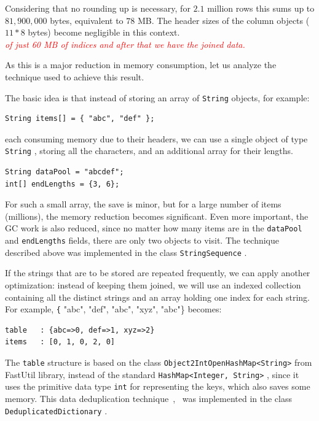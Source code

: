\documentclass[a4paper,twoside]{article}
\begin{document}
Considering that no rounding up is necessary, for $2.1$ million rows this sums up to $81,900,000$ bytes,
equivalent to $78$ MB. The header sizes of the column objects ($11*8$ bytes) become negligible in this context.
\\ \textcolor{red}{{\textit{of just 60 MB of indices and after that we have the joined data.} }}

As this is a major reduction in memory consumption, let us analyze the technique used to achieve this result.

The basic idea is that instead of storing an array of {\texttt{String} } objects, for example:
\begin{verbatim}
String items[] = { "abc", "def" };
\end{verbatim}
each consuming memory due to their headers, we can use 
a single object of type {\texttt{String} }, storing all the characters, and an additional array for their lengths.
\begin{verbatim}
String dataPool = "abcdef";
int[] endLengths = {3, 6};
\end{verbatim}

For such a small array, the save is minor, but for a large number of items (millions), the memory reduction becomes significant.
Even more important, the GC work is also reduced, since no matter how many items are in the {\texttt{dataPool} } and {\texttt{endLengths} } fields, there are only two objects to visit.
The technique described above was implemented in the class {\texttt{StringSequence} }.

If the strings that are to be stored are repeated frequently, we can apply another optimization:
instead of keeping them joined, we will use an indexed collection containing all the distinct strings and an array holding one index for each string.
For example, {\texttt{\{} "abc", "def", "abc", "xyz", "abc"\} } becomes:
\begin{verbatim}
table   : {abc=>0, def=>1, xyz=>2}
items   : [0, 1, 0, 2, 0]
\end{verbatim}
The {\texttt{table} } structure is based on the class {\texttt{Object2IntOpenHashMap<String>} } from FastUtil library, instead of the standard {\texttt{HashMap<Integer, String>} }, since it uses the primitive data type {\texttt{int} } for representing the keys, which also saves some memory.
This data deduplication technique~\cite{he:2010},~\cite{manogar:2014} was implemented in the class {\texttt{DeduplicatedDictionary} }.
\end{document}
